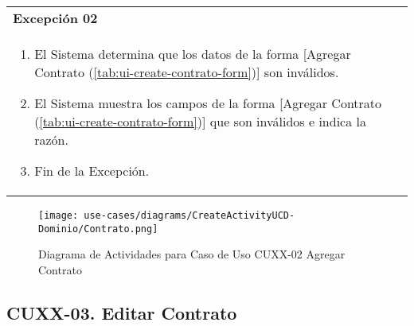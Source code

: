	\begin{tabular}{ p{15.5cm} }
		\textbf{Excepci\'on 02} \\
		\begin{enumerate}
			\item El Sistema determina que los datos de la forma [Agregar Contrato (\ref{tab:ui-create-contrato-form})] son inv\'alidos.
			\item El Sistema muestra los campos de la forma [Agregar Contrato (\ref{tab:ui-create-contrato-form})] que son inv\'alidos e indica la raz\'on.
			\item Fin de la Excepci\'on.
		\end{enumerate}
	\end{tabular}
	
	\begin{figure}[H]
		\begin{center}
			\label{tab:activity-create-ucd-entity-contrato}
			\texttt{[image: use-cases/diagrams/CreateActivityUCD-Dominio/Contrato.png]}
			\caption{Diagrama de Actividades para Caso de Uso CUXX-02 Agregar Contrato}	
	    \end{center}
	\end{figure}
			
	
	\clearpage
	\subsection{CUXX-03. Editar Contrato} \label{sec:cu-update-Contrato}
	
